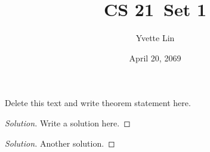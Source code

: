 \documentclass[11pt]{article}
\newcommand{\class}{CS 21}
\newcommand{\set}{Set 1}
\newcommand{\student}{Yvette Lin}
\newcommand{\duedate}{April 20, 2069}
\newenvironment{problem}[2][Problem]{\begin{trivlist} \item[\hskip \labelsep {\bfseries #1}\hskip \labelsep {\bfseries #2.}]}{\end{trivlist}}
\newenvironment{solution}{\begin{proof}[Solution]}{\end{proof}}
\newcommand{\prob}[1]{\begin{problem}{#1}\end{problem}}
\begin{document}
 
\title{\class \ \set}
\author{\student}
\date{\duedate}
\maketitle
\thispagestyle{titlepagestyle}
 
\begin{problem}{1.1}
    Delete this text and write theorem statement here.
\end{problem}

\begin{solution}
    Write a solution here.
\end{solution}

\pagebreak

\prob{1.2}

\begin{solution}
    Another solution.
\end{solution}
\end{document}
